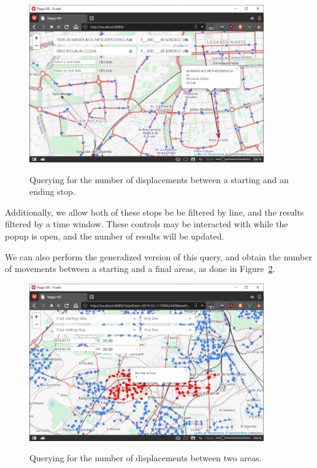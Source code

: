 	\begin{figure}[ht]
		\begin{center}
			{\includegraphics[width=0.9\textwidth]{screens/xy.png}}
		\end{center}
		\vspace{-0.5cm}
		\caption{Querying for the number of displacements between a starting and an ending stop.}
		\label{fig:ui:xy}
		\vspace{-0.5cm}
	\end{figure}
	
	Additionally, we allow both of these stops be be filtered by line, and the results filtered by a time window. These controls may be interacted with while the popup is open, and the number of results will be updated.
	
	We can also perform the generalized version of this query, and obtain the number of movements between a starting and a final areas, as done in Figure~\ref{fig:ui:xyarea}.
	
	\begin{figure}[ht]
		\begin{center}
			{\includegraphics[width=0.9\textwidth]{screens/xy_area.png}}
		\end{center}
		\vspace{-0.5cm}
		\caption{Querying for the number of displacements between two areas.}
		\label{fig:ui:xyarea}
		\vspace{-0.5cm}
	\end{figure}
	
